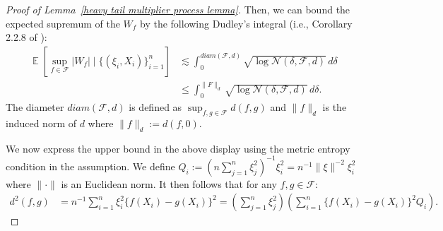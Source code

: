 \documentclass[12pt]{article}
\DeclareMathOperator*{\E}{\mathbb{E}}
\begin{document}
\begin{appendices}
\begin{proof}[Proof of Lemma~\ref{heavy tail multiplier process lemma}]
Then, we can bound the expected supremum of the $W_f$ by the following Dudley's integral (i.e., Corollary 2.2.8 of \cite{van1996weak}):
\begin{equation}
\label{apply dudley's integral}
\begin{aligned}
     \E\left[\sup_{f\in\mathcal{F}} |W_f|\mid\{(\xi_i,X_i)\}_{i=1}^n\right] 
     & \lesssim \int_0^{diam(\mathcal{F}, d)} \sqrt{\log \mathcal{N}(\delta, \mathcal{F}, d)} \, d\delta\\
     & \leq \int_0^{\|F\|_d} \sqrt{\log \mathcal{N}(\delta, \mathcal{F}, d)} \, d\delta. 
\end{aligned}
\end{equation}
The diameter $diam(\mathcal{F},d)$ is defined as $\sup_{f,g\in\mathcal{F}} d(f,g)$ and $\|f\|_d$ is the induced norm of $d$ where $\|f\|_d := d(f,0)$. 

We now express the upper bound in the above display using the metric entropy condition in the assumption. We define $Q_i := (n\sum_{j=1}^n \xi_j^2)^{-1} \xi_i^2 = n^{-1} \|\xi\|^{-2} \xi_i^2$ where $\|\cdot\|$ is an Euclidean norm. It then follows that for any $f,g\in\mathcal{F}$:
\begin{equation}\nonumber
\begin{aligned}
     d^2(f,g)& = n^{-1}\sum_{i=1}^n \xi_i^2 \{f(X_i) - g(X_i)\}^2 = \left(\sum_{j=1}^n \xi_j^2\right) \left(\sum_{i=1}^n \{f(X_i) - g(X_i)\}^2  Q_i \right).
\end{aligned}
\end{equation}


\end{proof}
\end{appendices}
\end{document}
